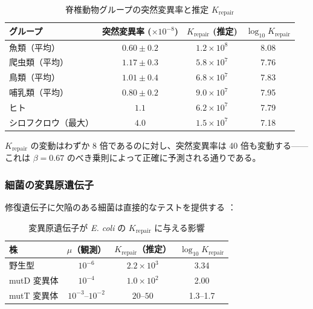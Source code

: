 \documentclass[12pt,a4paper]{article}
\theoremstyle{remark}
\begin{document}
	\begin{table}[htbp]
		\centering
		\caption{脊椎動物グループの突然変異率と推定 \(K_{\text{repair}}\) \cite{Bergeron2023}}
		\label{tab:vertebrate-mutations}
		\small
		\begin{tabular}{lccc}
			\toprule
			\textbf{グループ} & \textbf{突然変異率 (\(\times 10^{-8}\))} & \textbf{\(K_{\text{repair}}\) (推定)} & $\log_{10} K_{\text{repair}}$ \\
			\midrule
			魚類（平均） & $0.60 \pm 0.2$ & $1.2 \times 10^8$ & 8.08 \\
			爬虫類（平均） & $1.17 \pm 0.3$ & $5.8 \times 10^7$ & 7.76 \\
			鳥類（平均） & $1.01 \pm 0.4$ & $6.8 \times 10^7$ & 7.83 \\
			哺乳類（平均） & $0.80 \pm 0.2$ & $9.0 \times 10^7$ & 7.95 \\
			ヒト & $1.1$ & $6.2 \times 10^7$ & 7.79 \\
			シロフクロウ（最大） & $4.0$ & $1.5 \times 10^7$ & 7.18 \\
			\bottomrule
		\end{tabular}
	\end{table}
	
	\(K_{\text{repair}}\) の変動はわずか 8 倍であるのに対し、突然変異率は 40 倍も変動する——これは \(\beta = 0.67\) のべき乗則によって正確に予測される通りである。
	
	\subsubsection{細菌の変異原遺伝子}
	
	修復遺伝子に欠陥のある細菌は直接的なテストを提供する \cite{Drake1991}：
	
	\begin{table}[htbp]
		\centering
		\caption{変異原遺伝子が \textit{E. coli} の \(K_{\text{repair}}\) に与える影響 \cite{Drake1991}}
		\label{tab:mutators}
		\small
		\begin{tabular}{lccc}
			\toprule
			\textbf{株} & $\mu$（観測） & $K_{\text{repair}}$（推定） & $\log_{10} K_{\text{repair}}$ \\
			\midrule
			野生型 & $10^{-6}$ & $2.2 \times 10^3$ & 3.34 \\
			mutD 変異体 & $10^{-4}$ & $1.0 \times 10^2$ & 2.00 \\
			mutT 変異体 & $10^{-3}$--$10^{-2}$ & $20$--$50$ & 1.3--1.7 \\
			\bottomrule
		\end{tabular}
	\end{table}
	
\end{document}
